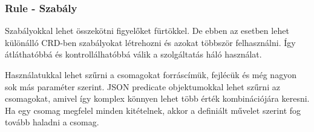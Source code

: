 \subsubsection{Rule - Szabály}

Szabályokkal lehet összekötni figyelőket fürtökkel. De ebben az esetben lehet különálló
CRD-ben szabályokat létrehozni és azokat többször felhasználni. Így átláthatóbbá és 
kontrollálhatóbbá válik a szolgáltatás háló használat. 

Használatukkal lehet szűrni a csomagokat forráscímük, fejlécük és még nagyon sok más 
paraméter szerint. JSON predicate objektumokkal lehet szűrni az csomagokat, amivel 
így komplex könnyen lehet több érték kombinációjára keresni. Ha egy csomag 
megfelel minden kitételnek, akkor a definiált művelet szerint fog tovább haladni a csomag. 